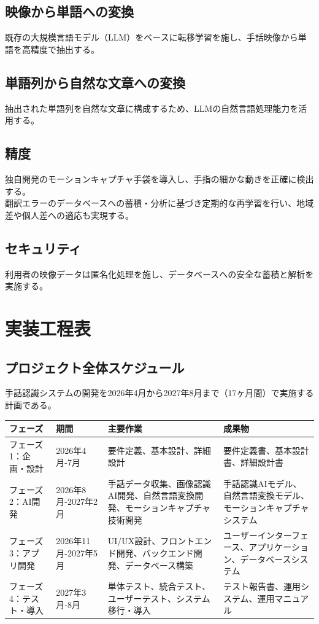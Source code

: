 \documentclass[12pt,a4paper]{jsarticle}
\begin{document}
\subsection{映像から単語への変換}
既存の大規模言語モデル（LLM）をベースに転移学習を施し、手話映像から単語を高精度で抽出する。
\subsection{単語列から自然な文章への変換}
抽出された単語列を自然な文章に構成するため、LLMの自然言語処理能力を活用する。
\subsection{精度}
独自開発のモーションキャプチャ手袋を導入し、手指の細かな動きを正確に検出する。\\
翻訳エラーのデータベースへの蓄積・分析に基づき定期的な再学習を行い、地域差や個人差への適応も実現する。
\subsection{セキュリティ}
利用者の映像データは匿名化処理を施し、データベースへの安全な蓄積と解析を実施する。

\section{実装工程表}

\subsection{プロジェクト全体スケジュール}
手話認識システムの開発を2026年4月から2027年8月まで（17ヶ月間）で実施する計画である。

\begin{longtable}{|p{2.5cm}|p{2cm}|p{4.5cm}|p{2.5cm}|}
\hline
\textbf{フェーズ} & \textbf{期間} & \textbf{主要作業} & \textbf{成果物} \\
\hline
\endhead

フェーズ1：企画・設計 & 2026年4月-7月 & 要件定義、基本設計、詳細設計 & 要件定義書、基本設計書、詳細設計書 \\
\hline

フェーズ2：AI開発 & 2026年8月-2027年2月 & 手話データ収集、画像認識AI開発、自然言語変換開発、モーションキャプチャ技術開発 & 手話認識AIモデル、自然言語変換モデル、モーションキャプチャシステム \\
\hline

フェーズ3：アプリ開発 & 2026年11月-2027年5月 & UI/UX設計、フロントエンド開発、バックエンド開発、データベース構築 & ユーザーインターフェース、アプリケーション、データベースシステム \\
\hline

フェーズ4：テスト・導入 & 2027年3月-8月 & 単体テスト、統合テスト、ユーザーテスト、システム移行・導入 & テスト報告書、運用システム、運用マニュアル \\
\hline
\end{longtable}
\newpage
\end{document}
